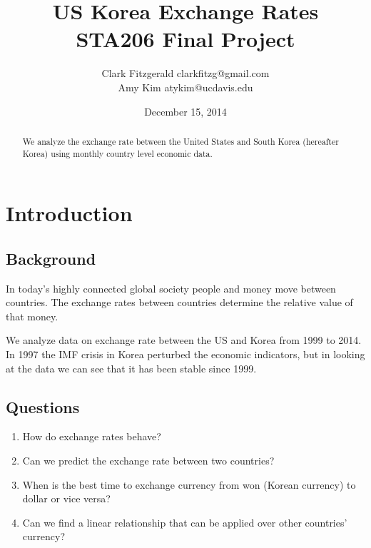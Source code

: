 \documentclass[12pt]{article}
\begin{document}
\title{US Korea Exchange Rates \\ STA206 Final Project}
\date{December 15, 2014}
\author{Clark Fitzgerald clarkfitzg@gmail.com \\ 
        Amy Kim atykim@ucdavis.edu}

\maketitle

\begin{abstract}
    We analyze the exchange rate between the United States and South Korea
    (hereafter Korea) using monthly country level economic data.
\end{abstract}

\section{Introduction}

\subsection{Background}

In today's highly connected global society people and money move between
countries. The exchange rates between countries determine the relative
value of that money.

We analyze data on exchange rate between the US and Korea from 1999 to
2014. In 1997 the IMF crisis in Korea perturbed the economic indicators,
but in looking at the data we can see that it has been stable since 1999.

\subsection{Questions}

\begin{enumerate}

    \item How do exchange rates behave?

    \item Can we predict the exchange rate between two countries?  

    \item When is the best time to exchange currency from won (Korean
        currency) to dollar or vice versa?  

    \item Can we find a linear relationship
        that can be applied over other countries' currency? 

\end{enumerate}
\end{document}
